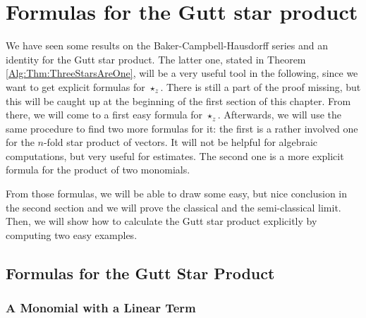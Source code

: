 
%
%

\chapter{Formulas for the Gutt star product}

We have seen some results on the Baker-Campbell-Hausdorff series and an 
identity for the Gutt star product. The latter one, stated in Theorem 
\ref{Alg:Thm:ThreeStarsAreOne}, will be a very useful tool in the following, 
since we want to get explicit formulas for $\star_z$. There is still a part of 
the proof missing, but this will be caught up at the beginning of the first 
section of this chapter. From there, we will come to a first easy formula for 
$\star_z$. Afterwards, we will use the same procedure to find two more 
formulas for it: the first is a rather involved one for the $n$-fold star 
product of vectors. It will not be helpful for algebraic computations, 
but very useful for estimates. The second one is a more explicit formula for 
the product of two monomials.

From those formulas, we will be able to draw some easy, but nice 
conclusion in the second section and we will prove the classical and the 
semi-classical limit. Then, we will show how to calculate the Gutt star 
product explicitly by computing two easy examples.




\section{Formulas for the Gutt Star Product}
\label{sec:chap4_Formulas}


%
%

\subsection{A Monomial with a Linear Term}

